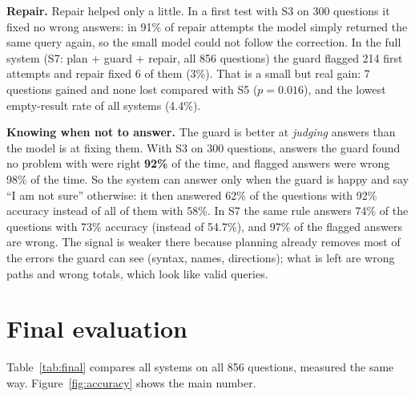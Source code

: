 \documentclass[11pt,a4paper]{article}
\begin{document}
\textbf{Repair.} Repair helped only a little. In a first test with S3 on 300 questions it
fixed no wrong answers: in 91\% of repair attempts the model simply returned the same query
again, so the small model could not follow the correction. In the full system (S7: plan +
guard + repair, all 856 questions) the guard flagged 214 first attempts and repair fixed 6 of
them (3\%). That is a small but real gain: 7 questions gained and none lost compared with S5
($p=0.016$), and the lowest empty-result rate of all systems (4.4\%).

\textbf{Knowing when not to answer.} The guard is better at \emph{judging} answers than the
model is at fixing them. With S3 on 300 questions, answers the guard found no problem with were
right \textbf{92\%} of the time, and flagged answers were wrong 98\% of the time. So the
system can answer only when the guard is happy and say ``I am not sure'' otherwise: it then
answered 62\% of the questions with 92\% accuracy instead of all of them with 58\%. In S7 the
same rule answers 74\% of the questions with 73\% accuracy (instead of 54.7\%), and 97\% of
the flagged answers are wrong. The signal is weaker there because planning already removes most
of the errors the guard can see (syntax, names, directions); what is left are wrong paths and
wrong totals, which look like valid queries.

\section{Final evaluation}
\label{sec:final}

Table~\ref{tab:final} compares all systems on all 856 questions, measured the same way.
Figure~\ref{fig:accuracy} shows the main number.
\end{document}
